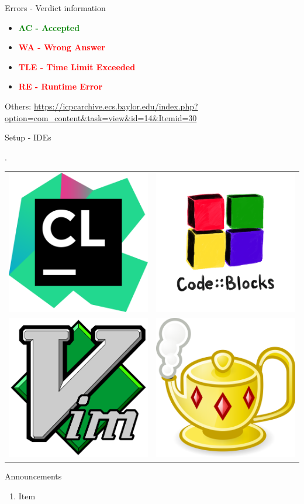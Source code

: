 \documentclass{beamer}
\begin{document}
\begin{frame}{Errors - Verdict information}

  \begin{itemize}
    \item \textcolor{green}{\textbf{AC - Accepted}}
    \item \textcolor{red}{\textbf{WA - Wrong Answer}}
    \item \textcolor{red}{\textbf{TLE - Time Limit Exceeded}}
    \item \textcolor{red}{\textbf{RE - Runtime Error}}
  \end{itemize}
    Others: \url{https://icpcarchive.ecs.baylor.edu/index.php?option=com_content&task=view&id=14&Itemid=30}

\end{frame}

\begin{frame}{Setup - IDEs}

  \vspace{2mm}
  \begin{centering}
  \setlength\tabcolsep{35pt}.
  \begin{tabular}{ c c }
    \includegraphics[width=0.23\linewidth]{../img/clion} &
    \includegraphics[width=0.23\linewidth]{../img/codeblocks} \\
    \includegraphics[width=0.23\linewidth]{../img/vim} &
    \includegraphics[width=0.23\linewidth]{../img/geany}
  \end{tabular}
  \end{centering}

\end{frame}

\begin{frame}{Announcements}

  \begin{enumerate}
    \item Item
  \end{enumerate}

\end{frame}
\end{document}
